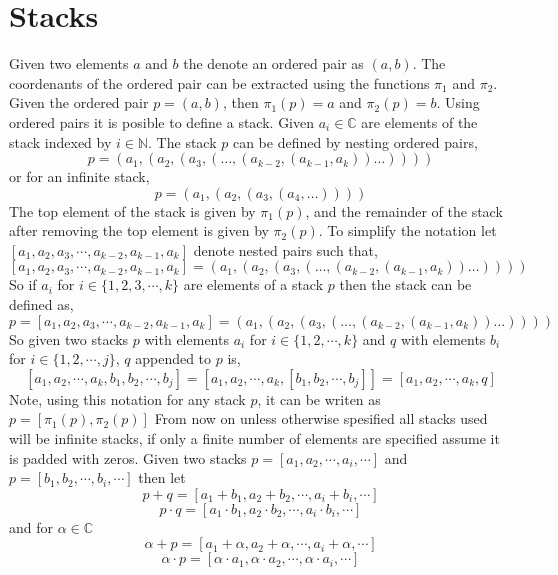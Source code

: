 \documentclass[%
 onecolumn,
 amsmath, amssymb, aps, pra, 10pt
]{revtex4-2}
\begin{document}
\section{Stacks}
Given two elements $a$ and $b$ the denote an ordered pair as $(a, b)$. The coordenants of the ordered pair can be extracted using the functions $\pi_1$ and $\pi_2$. Given the ordered pair $p=(a, b)$, then $\pi_1(p) =  a$ and $\pi_2(p) =  b$. Using ordered pairs it is posible to define a stack. Given $a_i \in \mathbb{C}$ are elements of the stack indexed by $i \in \mathbb{N}$. The stack $p$ can be defined by nesting ordered pairs,
\begin{equation}
p = (a_1, (a_2, (a_3, (\dots, (a_{k-2}, (a_{k-1}, a_k))\dots))))
\label{definition_finite_stack}
\end{equation}
or for an infinite stack,
\begin{equation}
p = (a_1, (a_2, (a_3, (a_4, \dots))))
\label{definition_infinite_stack}
\end{equation}
The top element of the stack is given by $\pi_1(p)$, and the remainder of the stack after removing the top element is given by $\pi_2(p)$. To simplify the notation let $[a_1, a_2, a_3, \cdots, a_{k-2}, a_{k-1}, a_k]$ denote nested pairs such that,
\[ [a_1, a_2, a_3, \cdots, a_{k-2}, a_{k-1}, a_k] = (a_1, (a_2, (a_3, (\dots, (a_{k-2}, (a_{k-1}, a_k))\dots)))) \]
So if $a_i$ for $i \in \{1, 2, 3, \cdots, k\}$ are elements of a stack $p$ then the stack can be defined as,
\[p = [a_1, a_2, a_3, \cdots, a_{k-2}, a_{k-1}, a_k] = (a_1, (a_2, (a_3, (\dots, (a_{k-2}, (a_{k-1}, a_k))\dots))))\]
So given two stacks $p$ with elements $a_i$ for $i \in \{1, 2, \cdots, k\}$ and $q$ with elements $b_i$ for $i \in \{1, 2, \cdots, j\}$, $q$ appended to $p$ is,
\[[a_1, a_2, \cdots, a_k, b_1, b_2, \cdots, b_j] = [a_1, a_2, \cdots, a_k, [b_1, b_2, \cdots, b_j]] = [a_1, a_2, \cdots, a_k, q]\]
Note, using this notation for any stack $p$, it can be writen as $p = [\pi_1(p), \pi_2(p)]$
From now on unless otherwise spesified all stacks used will be infinite stacks, if only a finite number of elements are specified assume it is padded with zeros. Given two stacks $p = [a_1, a_2, \cdots, a_i, \cdots]$ and $p = [b_1, b_2, \cdots, b_i, \cdots]$ then let
\[p + q = [a_1 + b_1, a_2 + b_2, \cdots, a_i + b_i, \cdots]\]
\[p \cdot q = [a_1 \cdot b_1, a_2 \cdot b_2, \cdots, a_i \cdot b_i, \cdots]\]
and for $\alpha \in \mathbb{C}$
\[\alpha + p = [a_1 + \alpha, a_2 + \alpha, \cdots, a_i + \alpha, \cdots]\]
\[\alpha \cdot p = [\alpha \cdot a_1, \alpha \cdot a_2, \cdots, \alpha \cdot a_i, \cdots]\]
\end{document}
